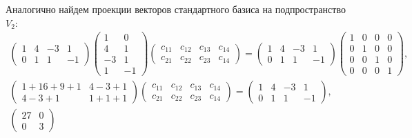 \documentclass[12pt]{article}
\begin{document}
    Аналогично найдем проекции векторов стандартного базиса на подпространство $V_2$:
    \begin{gather*}
        \begin{pmatrix}
            1 & 4 & -3 & 1  \\
            0 & 1 & 1  & -1
        \end{pmatrix}
        \begin{pmatrix}
            1  & 0  \\
            4  & 1  \\
            -3 & 1  \\
            1  & -1
        \end{pmatrix}
        \begin{pmatrix}
            c_{11} & c_{12} & c_{13} & c_{14} \\
            c_{21} & c_{22} & c_{23} & c_{14}
        \end{pmatrix}
        =
        \begin{pmatrix}
            1 & 4 & -3 & 1  \\
            0 & 1 & 1  & -1
        \end{pmatrix}
        \begin{pmatrix}
            1 & 0 & 0 & 0 \\
            0 & 1 & 0 & 0 \\
            0 & 0 & 1 & 0 \\
            0 & 0 & 0 & 1
        \end{pmatrix} , \\
        \begin{pmatrix}
            1 + 16 + 9 + 1 & 4 - 3 + 1 \\
            4 - 3 + 1      & 1 + 1 + 1
        \end{pmatrix}
        \begin{pmatrix}
            c_{11} & c_{12} & c_{13} & c_{14} \\
            c_{21} & c_{22} & c_{23} & c_{14}
        \end{pmatrix}
        =
        \begin{pmatrix}
            1 & 4 & -3 & 1  \\
            0 & 1 & 1  & -1
        \end{pmatrix} , \\
        \begin{pmatrix}
            27 & 0 \\
            0  & 3
        \end{pmatrix}

\end{gather*}
\end{document}
